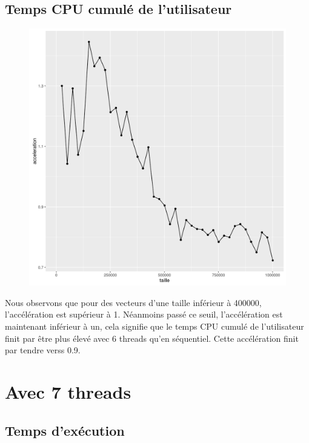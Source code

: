 \documentclass[a4paper,11pt]{scrartcl}
\begin{document}
\subsection{Temps CPU cumul\'e de l'utilisateur}
\begin{figure}[H] \center
   \includegraphics[scale=0.5] {graphes/temps_user_accel6.png}
\end{figure}
Nous observons que pour des vecteurs d'une taille inf\'erieur \`a 400000, l'acc\'el\'eration est sup\'erieur \`a 1. N\'eanmoins pass\'e ce seuil,  l'acc\'el\'eration est maintenant inf\'erieur \`a un, cela signifie que le temps CPU cumul\'e de l'utilisateur finit par \^{e}tre plus \'elev\'e avec 6 threads qu'en s\'equentiel. Cette acc\'el\'eration finit par tendre verss 0.9.


\section{Avec 7 threads}
\subsection{Temps d'ex\'ecution}
\end{document}
